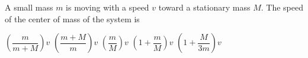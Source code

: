 \documentclass{../../oss-apphys-exam}
\begin{document}
\begin{multicols*}{2}
\begin{questions}

    \question A small mass $m$ is moving with a speed $v$ toward a
    stationary mass $M$. The speed of the center of mass of the system is
    \begin{choices}
      \choice $\left(\dfrac m{m+M}\right)v$
      \choice $\left(\dfrac{m+M} m\right)v$
      \choice $\left(\dfrac mM\right)v$
      \choice $\left(1+\dfrac mM\right)v$
      \choice $\left(1+\dfrac M{3m}\right)v$
    \end{choices}


\end{questions}
\end{multicols*}
\end{document}
